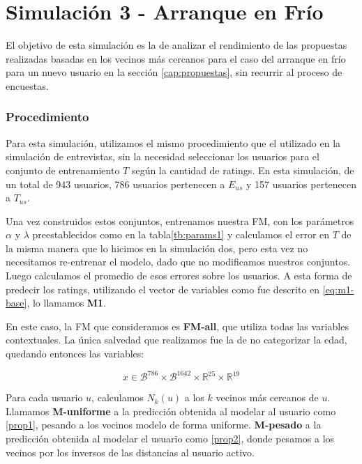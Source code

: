 \documentclass[hidelinks,12pt,a4paper]{book}
\theoremstyle{plain}
\theoremstyle{definition}
\begin{document}
\section{Simulación 3 - Arranque en Frío}

El objetivo de esta simulación es la de analizar el rendimiento de las propuestas realizadas basadas en los vecinos más cercanos para el caso del arranque en frío para un nuevo usuario en la sección \ref{cap:propuestas}, sin recurrir al proceso de encuestas.

\subsubsection{Procedimiento}

Para esta simulación, utilizamos el mismo procedimiento que el utilizado en la simulación de entrevistas, sin la necesidad seleccionar los usuarios para el conjunto de entrenamiento $T$ según la cantidad de ratings. En esta simulación, de un total de 943 usuarios, 786 usuarios pertenecen a $E_{us}$ y 157 usuarios pertenecen a $T_{us}$.

Una vez construidos estos conjuntos, entrenamos nuestra FM, con los parámetros $\alpha$ y $\lambda$ preestablecidos como en la tabla\ref{tb:params1} y calculamos el error en $T$ de la misma manera que lo hicimos en la simulación dos, pero esta vez no necesitamos re-entrenar el modelo, dado que no modificamos nuestros conjuntos. Luego calculamos el promedio de esos errores sobre los usuarios. A esta forma de predecir los ratings, utilizando el vector de variables como fue descrito en \eqref{eq:m1-base}, lo llamamos \textbf{M1}.

En este caso, la FM que consideramos es \textbf{FM-all}, que utiliza todas las variables contextuales. La única salvedad que realizamos fue la de no categorizar la edad, quedando entonces las variables:

\begin{equation*}
x \in \mathcal{B}^{786} \times \mathcal{B}^{1642} \times \mathbb{R}^{25} \times \mathbb{R}^{19} 
\end{equation*}

Para cada usuario $u$, calculamos $N_k(u)$ a los $k$ vecinos más cercanos de $u$. Llamamos \textbf{M-uniforme} a la predicción obtenida al modelar al usuario como \eqref{prop1}, pesando a los vecinos modelo de forma uniforme. \textbf{M-pesado} a la predicción obtenida al modelar el usuario como \eqref{prop2}, donde pesamos a los vecinos por los inversos de las distancias al usuario activo.
\end{document}

